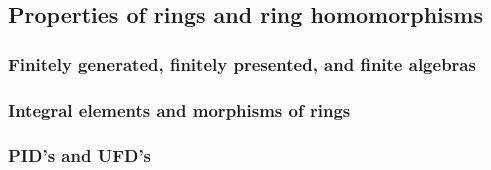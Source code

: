 



















\subsection{Properties of rings and ring homomorphisms}

\subsubsection{Finitely generated, finitely presented, and finite algebras}








\subsubsection{Integral elements and morphisms of rings}



\subsubsection{PID's and UFD's}




